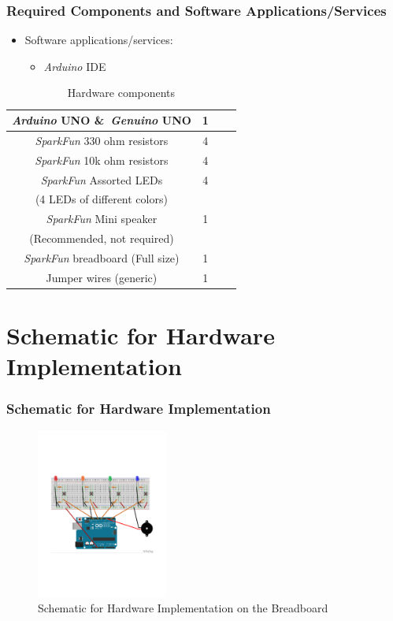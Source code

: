 \documentclass[xcolor={usenames,dvipsnames},hyperref={hyperindex,bookmarks}]{beamer}
\begin{document}
\frame
{
	\frametitle{Required Components and Software Applications/Services}

	\begin{itemize}
	\item Software applications/services:
		\begin{itemize}
		\item {\it Arduino} IDE
		\end{itemize}
	\end{itemize}

	\begin{table}[htdp]
\caption{Hardware components}
\label{tab:Table}
	\begin{center}
		\begin{tabular}{|c|c|c|c|}
		\hline
		{\it Arduino} UNO {\rm \&}\ {\it Genuino} UNO & 1 \\
		\hline
		{\it SparkFun} 330 ohm resistors & 4 \\
		\hline
		{\it SparkFun} 10k ohm resistors & 4 \\
		\hline
		{\it SparkFun} Assorted LEDs & 4 \\
		(4 LEDs of different colors) & \\
		\hline
		{\it SparkFun} Mini speaker & 1 \\
		(Recommended, not required) & \\
		\hline
		{\it SparkFun} breadboard (Full size) & 1 \\
		\hline
		Jumper wires (generic) & 1 \\
		\hline
		\end{tabular}
	\end{center}
\end{table}

}


\section{Schematic for Hardware Implementation}

\frame
{
	\frametitle{Schematic for Hardware Implementation}

\begin{figure}[h]
\centering 
\includegraphics[height=2.2in]{./pics/hw-implementation-simple-simon}
\caption{Schematic for Hardware Implementation on the Breadboard}
\label{fig:hwimplementationsimplesimon}
\end{figure}
}
\end{document}
